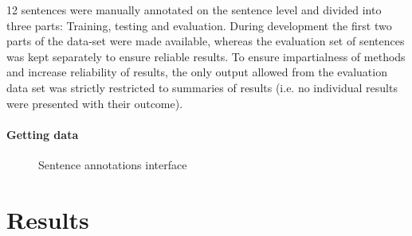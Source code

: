 \documentclass[a4paper,11pt]{kth-mag}
\newcommand{\numAnnotated}{12 }
\newif\ifhasStudiedFailures
\begin{document}
\numAnnotated sentences were manually annotated on the sentence level and divided into three parts: Training, testing and evaluation. During development the first two parts of the data-set were made available, whereas the evaluation set of sentences was kept separately to ensure reliable results. To ensure impartialness of methods and increase reliability of results, the only output allowed from the evaluation data set was strictly restricted to summaries of results (i.e. no individual results were presented with their outcome)\ifhasStudiedFailures, except for when failing instances were explicitly studied after method development was finished\fi.

\subsection{Getting data}

\begin{figure}[h]
  \centering
  \caption{Sentence annotations interface}
  \label{fig:annotate_sentence}
\end{figure}







\part{Results}
\end{document}
